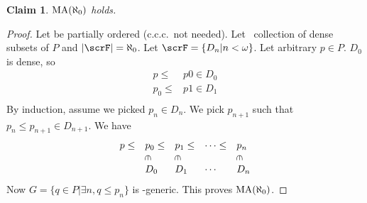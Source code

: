 \documentclass[11pt,pdftex,twoside,a4paper]{article}
\newcommand{\MA}{\ensuremath{\mathop{\rm MA}\nolimits}}
\newcommand{\ccc}{c.c.c.}
\newcommand{\crotin}{\rotatebox[origin=c]{-90}{\(\in\)}}
\newtheorem{claim}[thm]{Claim}
\theoremstyle{definition}
\begin{document}
\begin{claim}
\(\MA(\aleph_0)\) holds.
\end{claim}
\begin{proof}
Let  be partially ordered (\ccc\ not needed).
Let \scrF\ collection of dense subsets of $P$
and \(|\scrF| = \aleph_0\). Let \(\scrF = \{D_n| n < \omega\}\).
Let arbitrary \(p\in P\).  \(D_0\) is dense, so 
\begin{align*}
p \leq & p0 \in D_0 \\
p_0 \leq & p1 \in D_1 \\
\end{align*}
By induction, assume we picked \(p_n \in D_n\).
We pick \(p_{n+1}\) such that \(p_n \leq p_{n+1} \in D_{n+1}\).
We have 
\begin{equation*}
\begin{array}{lllll}
p \leq & p_0 \leq & p_1 \leq &\cdots \leq & p_n \\
       &\crotin   &\crotin   &            & \crotin \\
       & D_0      & D_1      &\cdots      & D_n
\end{array}
\end{equation*}
Now \(G = \{q \in P |\exists n, q \leq p_n\}\) is \scrF-generic.
This proves \(\MA(\aleph_0)\).
\end{proof}
\end{document}
